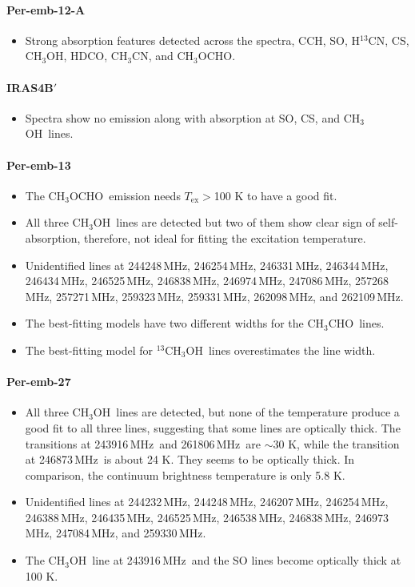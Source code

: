 \documentclass[twocolumn]{aastex62}
\newcommand{\mhz}{\mbox{\,MHz}}
\newcommand{\htcn}{\mbox{H$^{13}$CN}}
\newcommand{\methylformate}{\mbox{CH$_{3}$OCHO}}
\newcommand{\methanol}{\mbox{CH$_{3}$OH}}
\newcommand{\tmethanol}{\mbox{$^{13}$CH$_{3}$OH}}
\newcommand{\acetaldehyde}{\mbox{CH$_{3}$CHO}}
\newcommand{\methylcyanide}{\mbox{CH$_{3}$CN}}
\begin{document}
\paragraph{Per-emb-12-A}
\begin{itemize}
  \item Strong absorption features detected across the spectra, CCH, SO, \htcn, CS, \methanol, HDCO, \methylcyanide, and \methylformate.
\end{itemize}

\paragraph{IRAS4B$\prime$}
\begin{itemize}
  \item Spectra show no emission along with absorption at SO, CS, and \methanol\ lines.
\end{itemize}

\paragraph{Per-emb-13}
\begin{itemize}
  \item The \methylformate\ emission needs $T_\text{ex} > $100 K to have a good fit.
  \item All three \methanol\ lines are detected but two of them show clear sign of self-absorption, therefore, not ideal for fitting the excitation temperature.
  \item Unidentified lines at 244248\mhz, 246254\mhz, 246331\mhz, 246344\mhz, 246434\mhz, 246525\mhz, 246838\mhz, 246974\mhz, 247086\mhz, 257268\mhz, 257271\mhz, 259323\mhz, 259331\mhz, 262098\mhz, and 262109\mhz.
  \item The best-fitting models have two different widths for the \acetaldehyde\ lines.  
  \item The best-fitting model for \tmethanol\ lines overestimates the line width. 
\end{itemize}

\paragraph{Per-emb-27}
\begin{itemize}
  \item All three \methanol\ lines are detected, but none of the temperature produce a good fit to all three lines, suggesting that some lines are optically thick.  The transitions at 243916\mhz\ and 261806\mhz\ are $\sim$30 K, while the transition at 246873\mhz\ is about 24 K.  They seems to be optically thick.  In comparison, the continuum brightness temperature is only 5.8 K.
  \item Unidentified lines at 244232\mhz, 244248\mhz, 246207\mhz, 246254\mhz, 246388\mhz, 246435\mhz, 246525\mhz, 246538\mhz, 246838\mhz, 246973\mhz, 247084\mhz, and 259330\mhz.
  \item The \methanol\ line at 243916\mhz\ and the SO lines become optically thick at 100 K.
\end{itemize}
\end{document}

